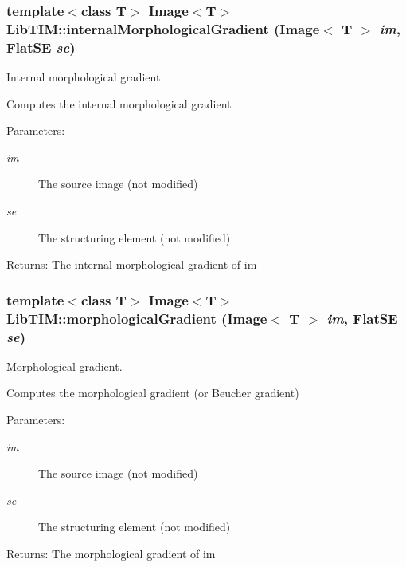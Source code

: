 \subsubsection{\setlength{\rightskip}{0pt plus 5cm}template$<$class T$>$ Image$<$T$>$ Lib\-TIM::internal\-Morphological\-Gradient (Image$<$ T $>$ {\em im}, Flat\-SE {\em se})}\label{group__basisFunctions_ga9}


Internal morphological gradient. 

Computes the internal morphological gradient \begin{Desc}
\item[Parameters:]
\begin{description}
\item[{\em im}]The source image (not modified) \item[{\em se}]The structuring element (not modified) \end{description}
\end{Desc}
\begin{Desc}
\item[Returns:]The internal morphological gradient of im\end{Desc}
\subsubsection{\setlength{\rightskip}{0pt plus 5cm}template$<$class T$>$ Image$<$T$>$ Lib\-TIM::morphological\-Gradient (Image$<$ T $>$ {\em im}, Flat\-SE {\em se})}\label{group__basisFunctions_ga8}


Morphological gradient. 

Computes the morphological gradient (or Beucher gradient) \begin{Desc}
\item[Parameters:]
\begin{description}
\item[{\em im}]The source image (not modified) \item[{\em se}]The structuring element (not modified) \end{description}
\end{Desc}
\begin{Desc}
\item[Returns:]The morphological gradient of im\end{Desc}
